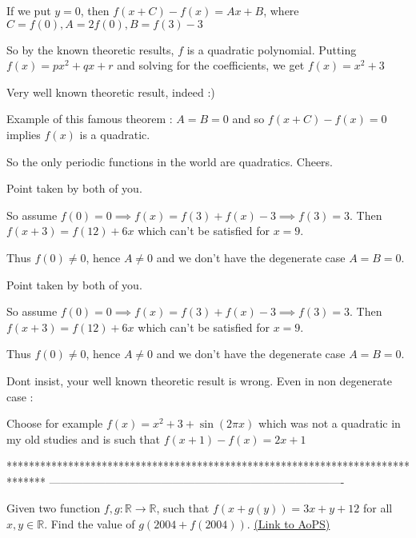 \begin{solution}
	\begin{tcolorbox}If we put $y=0$, then $f(x+C)-f(x)=Ax+B$, where $C=f(0), A=2f(0), B=f(3)-3$

So by the known theoretic results, $f$ is a quadratic polynomial. Putting $f(x)=px^2+qx+r$ and solving for the coefficients, we get $f(x)=x^2+3$\end{tcolorbox}
Very well known theoretic result, indeed :)

Example of this famous theorem : $A=B=0$ and so $f(x+C)-f(x)=0$ implies $f(x)$ is a quadratic.

So the only periodic functions in the world are quadratics.
Cheers.
\end{solution}



\begin{solution}
	Point taken by both of you.

So assume $f(0)=0\implies f(x)=f(3)+f(x)-3\implies f(3)=3$. Then $f(x+3)=f(12)+6x$ which can't be satisfied for $x=9$.

Thus $f(0)\neq 0$, hence $A\neq 0$ and we don't have the degenerate case $A=B=0$.
\end{solution}



\begin{solution}
	\begin{tcolorbox}Point taken by both of you.

So assume $f(0)=0\implies f(x)=f(3)+f(x)-3\implies f(3)=3$. Then $f(x+3)=f(12)+6x$ which can't be satisfied for $x=9$.

Thus $f(0)\neq 0$, hence $A\neq 0$ and we don't have the degenerate case $A=B=0$.\end{tcolorbox}
Dont insist, your well known theoretic result is wrong. Even in non degenerate case :

Choose for example $f(x)=x^2+3+\sin(2\pi x)$ which was not a quadratic in my old studies and is such that $f(x+1)-f(x)=2x+1$
\end{solution}
*******************************************************************************
-------------------------------------------------------------------------------

\begin{problem}
	Given two function $f, g : \mathbb{R} \to\mathbb{R}$, such that $f(x+g(y))=3x+y+12$ for all $x, y \in \mathbb R$. Find the value of $g(2004+f(2004))$.
	\flushright \href{https://artofproblemsolving.com/community/c6h412703}{(Link to AoPS)}
\end{problem}



